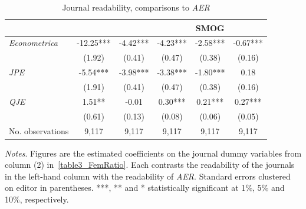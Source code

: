 \begin{table}[H]
    \footnotesize
    \centering
    \begin{threeparttable}
        \caption{Journal readability, comparisons to \textit{AER}}
        \label{table3_journal}
        \begin{tabular}{p{3cm}S@{}S@{}S@{}S@{}S@{}}
            \toprule
            &{}&{}&{}&{SMOG}&{}\\
            \midrule
            \textit{Econometrica}         &      -12.25***&       -4.42***&       -4.23***&       -2.58***&       -0.67***\\
                                          &      {(1.92)}   &      {(0.41)}   &      {(0.47)}   &      {(0.38)}   &      {(0.16)}   \\
            \textit{JPE}                  &       -5.54***&       -3.98***&       -3.38***&       -1.80***&        0.18   \\
                                          &      {(1.91)}   &      {(0.41)}   &      {(0.47)}   &      {(0.38)}   &      {(0.16)}   \\
            \textit{QJE}                  &        1.51** &       -0.01   &        0.30***&        0.21***&        0.27***\\
                                          &      {(0.61)}   &      {(0.13)}   &      {(0.08)}   &      {(0.06)}   &      {(0.05)}   \\
            \midrule
            No. observations              &       9,117   &       9,117   &       9,117   &       9,117   &       9,117   \\
            \bottomrule
        \end{tabular}
        \begin{tablenotes}
            \tiny
            \item \textit{Notes}. Figures are the estimated coefficients on the journal dummy variables from column {(2)} in~\autoref{table3_FemRatio}. Each contrasts the readability of the journals in the left-hand column with the readability of \textit{AER}. Standard errors clustered on editor in parentheses. ***, ** and * statistically significant at 1\%, 5\% and 10\%, respectively.
        \end{tablenotes}
    \end{threeparttable}
\end{table}